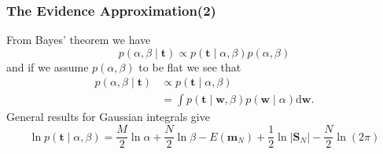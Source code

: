 \documentclass{beamer}
\begin{document}
\begin{frame}
    \frametitle{The Evidence Approximation(2)}
    From Bayes' theorem we have
    \begin{equation}
        p(\alpha, \beta \mid \mathbf{t}) \propto p(\mathbf{t} \mid \alpha, \beta) p(\alpha, \beta)
    \end{equation}
    and if we assume $ p(\alpha, \beta)$ to be flat we see that
    \begin{equation}
        \begin{aligned}
            p(\alpha, \beta \mid \mathbf{t}) & \propto p(\mathbf{t} \mid \alpha, \beta)                                                     \\
                                             & =\int p(\mathbf{t} \mid \mathbf{w}, \beta) p(\mathbf{w} \mid \alpha) \mathrm{d} \mathbf{w} .
        \end{aligned}
    \end{equation}
    General results for Gaussian integrals give
    \begin{equation}
        \ln p(\mathbf{t} \mid \alpha, \beta)=\frac{M}{2} \ln \alpha+\frac{N}{2} \ln \beta-E\left(\mathbf{m}_{N}\right)+\frac{1}{2} \ln \left|\mathbf{S}_{N}\right|-\frac{N}{2} \ln (2 \pi)
    \end{equation}
\end{frame}
\end{document}
